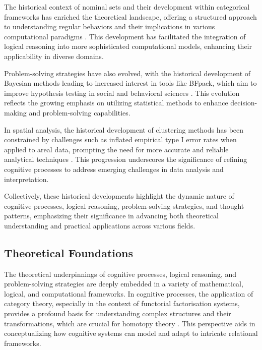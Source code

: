 The historical context of nominal sets and their development within categorical frameworks has enriched the theoretical landscape, offering a structured approach to understanding regular behaviors and their implications in various computational paradigms \cite{milius2016regularbehavioursnames}. This development has facilitated the integration of logical reasoning into more sophisticated computational models, enhancing their applicability in diverse domains.



Problem-solving strategies have also evolved, with the historical development of Bayesian methods leading to increased interest in tools like BFpack, which aim to improve hypothesis testing in social and behavioral sciences \cite{mulder2019bfpackflexiblebayesfactor}. This evolution reflects the growing emphasis on utilizing statistical methods to enhance decision-making and problem-solving capabilities.



In spatial analysis, the historical development of clustering methods has been constrained by challenges such as inflated empirical type I error rates when applied to areal data, prompting the need for more accurate and reliable analytical techniques \cite{vidanapathirana2022clusterdetectioncapabilitiesaverage}. This progression underscores the significance of refining cognitive processes to address emerging challenges in data analysis and interpretation.



Collectively, these historical developments highlight the dynamic nature of cognitive processes, logical reasoning, problem-solving strategies, and thought patterns, emphasizing their significance in advancing both theoretical understanding and practical applications across various fields.



\subsection{Theoretical Foundations} \label{subsec:Theoretical Foundations}



The theoretical underpinnings of cognitive processes, logical reasoning, and problem-solving strategies are deeply embedded in a variety of mathematical, logical, and computational frameworks. In cognitive processes, the application of category theory, especially in the context of functorial factorisation systems, provides a profound basis for understanding complex structures and their transformations, which are crucial for homotopy theory \cite{athorne2013coalgebraicstructurecellcomplexes}. This perspective aids in conceptualizing how cognitive systems can model and adapt to intricate relational frameworks.



